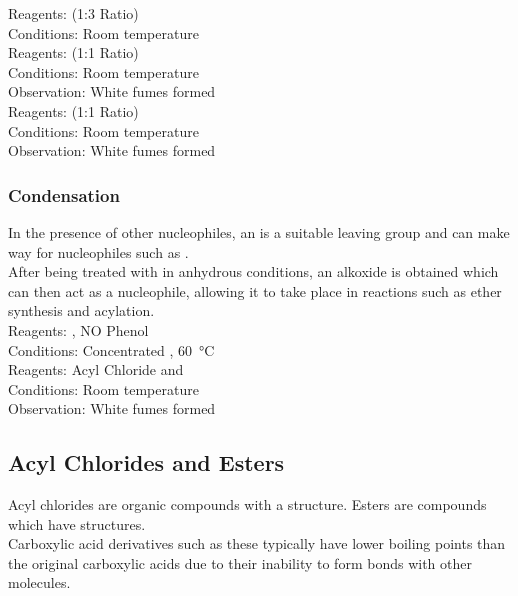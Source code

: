 \documentclass[../main]{subfiles}
\begin{document}
	Reagents:  (1:3 Ratio) \\
	Conditions:  Room temperature \\

	Reagents:  (1:1 Ratio) \\
	Conditions:  Room temperature \\
	Observation: White fumes formed  \\

	Reagents:  (1:1 Ratio) \\
	Conditions:  Room temperature \\
	Observation: White fumes formed  \\

	\subsubsection{Condensation}

	In the presence of other nucleophiles, an  is a suitable leaving group and can make way for nucleophiles such as . \\

	After being treated with  in anhydrous conditions, an alkoxide  is obtained which can then act as a nucleophile, allowing it to take place in reactions such as ether synthesis and acylation. \\

	Reagents: , NO Phenol \\
	Conditions:  Concentrated , \SI{60}{\celsius} \\

	Reagents: Acyl Chloride and  \\
	Conditions:  Room temperature \\
	Observation: White fumes formed  \\

	\subsection{Acyl Chlorides and Esters}

	Acyl chlorides are organic compounds with a  structure. Esters are compounds which have  structures. \\

	Carboxylic acid derivatives such as these typically have lower boiling points than the original carboxylic acids due to their inability to form  bonds with other molecules. \\
\end{document}
